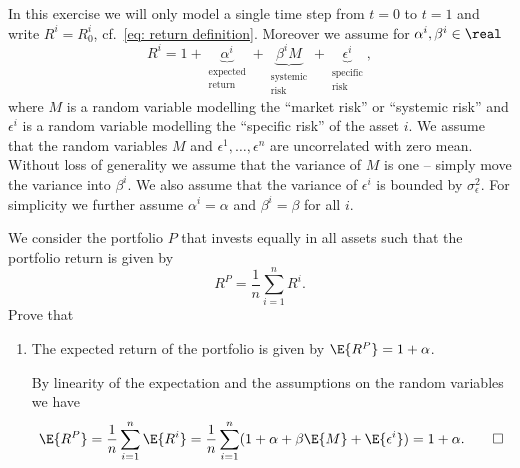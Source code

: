 \begin{exercise}
    In this exercise we will only model a single time step from \(t=0\) to
    \(t=1\) and write \(R^i = R_0^i\), cf.~\eqref{eq: return definition}. Moreover we assume for \(\alpha^i,
    \beta^i \in \real\)
    \[
        R^i = 1
        + \underbrace{\alpha^i}_{\substack{\text{expected}\\ \text{return}}}
        + \underbrace{\beta^i M}_{\substack{\text{systemic}\\\text{risk}}}
        + \underbrace{\epsilon^i}_{\substack{\text{specific}\\\text{risk}}},
    \]
    where \(M\) is a random variable modelling the ``market risk'' or ``systemic
    risk'' and \(\epsilon^i\) is a random variable modelling the ``specific
    risk'' of the asset \(i\). We assume that the random variables \(M\) and
    \(\epsilon^1, \dots, \epsilon^n\) are uncorrelated with zero mean. Without
    loss of generality we assume that the variance of \(M\) is one -- simply move
    the variance into \(\beta^i\). We also assume that the variance of
    \(\epsilon^i\) is bounded by \(\sigma_\epsilon^2\). For simplicity we
    further assume \(\alpha^i = \alpha\) and \(\beta^i = \beta\) for all \(i\).

    We consider the portfolio \(P\) that invests equally in all assets such that
    the portfolio return is given by
    \[
        R^P = \frac1n \sum_{i=1}^n R^i.
    \]
    Prove that
    \begin{enumerate}[label=(\alph*),noitemsep]
        \item The expected return of the portfolio is given by \(\E{R^P} = 1 + \alpha\).
        \begin{solution}
            By linearity of the expectation and the assumptions on the random variables we have 
            \[
                \E{R^P}
                = \frac1n \sum_{i=1}^n \E{R^i}
                = \frac1n \sum_{i=1}^n (1 + \alpha + \beta \E{M} + \E{\epsilon^i})
                = 1 + \alpha.
                \qedhere
            \]
        \end{solution}
        

\end{enumerate}
\end{exercise}
